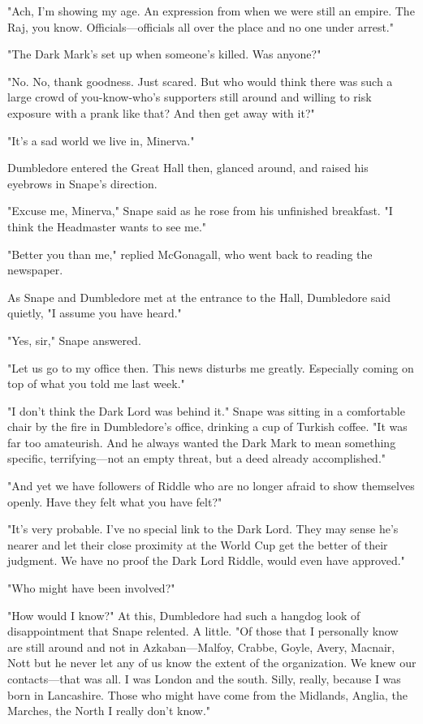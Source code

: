 "Ach, I'm showing my age. An expression from when we were still an empire. The Raj, you know. Officials—officials all over the place and no one under arrest."

"The Dark Mark's set up when someone's killed. Was anyone{\el}?"

"No. No, thank goodness. Just scared. But who would think there was such a large crowd of you-know-who's supporters still around and willing to risk exposure with a prank like that? And then get away with it?"

"It's a sad world we live in, Minerva."

Dumbledore entered the Great Hall then, glanced around, and raised his eyebrows in Snape's direction.

"Excuse me, Minerva," Snape said as he rose from his unfinished breakfast. "I think the Headmaster wants to see me."

"Better you than me," replied McGonagall, who went back to reading the newspaper.

As Snape and Dumbledore met at the entrance to the Hall, Dumbledore said quietly, "I assume you have heard."

"Yes, sir," Snape answered.

"Let us go to my office then. This news disturbs me greatly. Especially coming on top of what you told me last week."

"I don't think the Dark Lord was behind it." Snape was sitting in a comfortable chair by the fire in Dumbledore's office, drinking a cup of Turkish coffee. "It was far too amateurish. And he always wanted the Dark Mark to mean something specific, terrifying—not an empty threat, but a deed already accomplished."

"And yet we have followers of{\el} Riddle{\el} who are no longer afraid to show themselves openly. Have they felt what you have felt?"

"It's very probable. I've no special link to the Dark Lord. They may sense he's nearer and let their close proximity at the World Cup get the better of their judgment. We have no proof the Dark Lord{\el} Riddle, would even have approved."

"Who might have been involved?"

"How would I know?" At this, Dumbledore had such a hangdog look of disappointment that Snape relented. A little. "Of those that I personally know are still around and not in Azkaban—Malfoy, Crabbe, Goyle, Avery, Macnair, Nott{\el} but he never let any of us know the extent of the organization. We knew our contacts—that was all. I was London and the south. Silly, really, because I was born in Lancashire. Those who might have come from the Midlands, Anglia, the Marches, the North{\el} I really don't know."

